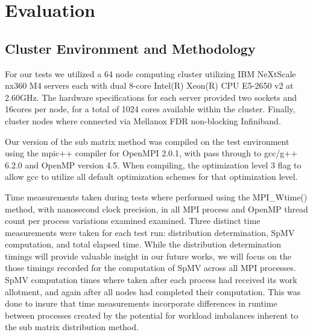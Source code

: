\section{Evaluation}\label{sec:dspmv-evaluation}


\subsection{Cluster Environment and Methodology}

For our tests we utilized a 64 node computing cluster utilizing IBM NeXtScale nx360 M4 servers each with dual 8-core Intel(R) Xeon(R) CPU E5-2650 v2 at 2.60GHz. 
The hardware specifications for each server provided two sockets and 16cores per node, for a total of 1024 cores available within the cluster. 
Finally, cluster nodes where connected via Mellanox FDR non-blocking Infiniband.

Our version of the sub matrix method was compiled on the test environment using the mpic++ compiler for OpenMPI 2.0.1, with pass through to gcc/g++ 6.2.0 and OpenMP version 4.5. 
When compiling, the optimization level 3 flag to allow gcc to utilize all default optimization schemes for that optimization level. 

Time measurements taken during tests where performed using the MPI\_Wtime() method, with nanosecond clock precision, in all MPI process and OpenMP thread count per process variations examined examined. 
Three distinct time measurements were taken for each test run: distribution determination, SpMV computation, and total elapsed time. 
While the distribution determination timings will provide valuable insight in our future works, we will focus on the those timings recorded for the computation of SpMV across all MPI processes.
SpMV computation times where taken after each process had received its work allotment, and again after all nodes had completed their computation. 
This was done to insure that time measurements incorporate differences in runtime between processes created by the potential for workload imbalances inherent to the sub matrix distribution method.

